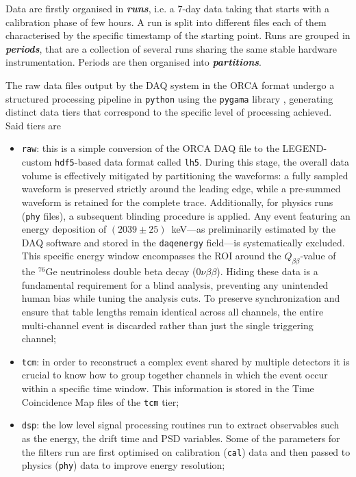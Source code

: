 Data are firstly organised in \textbf{\textit{runs}}, i.e. a 7-day data taking that starts with a calibration phase of few hours. A run is split into different files each of them characterised by the specific timestamp of the starting point. Runs are grouped in \textbf{\textit{periods}}, that are a collection of several runs sharing the same stable hardware instrumentation. Periods are then organised into \textbf{\textit{partitions}}. 

The raw data files output by the DAQ system in the ORCA format undergo a structured processing pipeline in \texttt{python} using the \texttt{pygama} library \cite{pygama}, generating distinct data tiers that correspond to the specific level of processing achieved. Said tiers are
\begin{itemize}
    \item \texttt{raw}: this is a simple conversion of the ORCA DAQ file to the LEGEND-custom \texttt{hdf5}-based data format called \texttt{lh5}. 
    During this stage, the overall data volume is effectively mitigated by partitioning the waveforms: a fully sampled waveform is preserved strictly around the leading edge, while a pre-summed waveform is retained for the complete trace. 
    Additionally, for physics runs (\texttt{phy} files), a subsequent blinding procedure is applied. Any event featuring an energy deposition of $(2039 \pm 25)$~keV---as preliminarily estimated by the DAQ software and stored in the \texttt{daqenergy} field---is systematically excluded. This specific energy window encompasses the \ac{ROI} around the $Q_{\beta\beta}$-value of the $^{76}\mathrm{Ge}$ neutrinoless double beta decay ($0\nu\beta\beta$). Hiding these data is a fundamental requirement for a blind analysis, preventing any unintended human bias while tuning the analysis cuts. To preserve synchronization and ensure that table lengths remain identical across all channels, the entire multi-channel event is discarded rather than just the single triggering channel;
    \item \texttt{tcm}: in order to reconstruct a complex event shared by multiple detectors it is crucial to know how to group together channels in which the event occur within a specific time window. This information is stored in the Time Coincidence Map files of the \texttt{tcm} tier;
    \item \texttt{dsp}: the low level signal processing routines run to extract observables such as the energy, the drift time and \ac{PSD} variables. Some of the parameters for the filters run are first optimised on calibration (\texttt{cal}) data and then passed to physics (\texttt{phy}) data to improve energy resolution;

\end{itemize}
